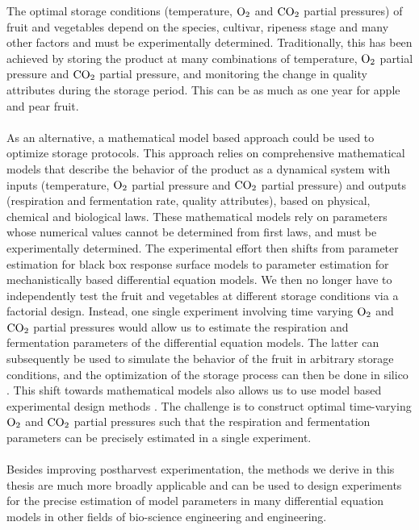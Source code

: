 The optimal storage conditions (temperature, $\text{O}_2$ and $\text{CO}_2$ partial pressures) of fruit and vegetables depend on the species, cultivar, ripeness stage and many other factors and must be experimentally determined. Traditionally, this has been achieved by storing the product at many combinations of temperature, $\text{O}_2$ partial pressure and $\text{CO}_2$ partial pressure, and monitoring the change in quality attributes during the storage period. This can be as much as one year for apple and pear fruit.
\\
\\
As an alternative, a mathematical model based approach could be used to optimize storage protocols. This approach relies on comprehensive mathematical models that describe the behavior of the product as a dynamical system with inputs (temperature, $\text{O}_2$ partial pressure and $\text{CO}_2$  partial pressure) and outputs (respiration and fermentation rate, quality attributes), based on physical, chemical and biological laws. {\color{red}These mathematical models rely on parameters whose numerical values cannot be determined from first laws, and must be experimentally determined. The experimental effort then shifts from parameter estimation for black box response surface models to parameter estimation for mechanistically based differential equation models. We then no longer have to independently test the fruit and vegetables at different storage conditions via a factorial design. Instead, one single experiment involving time varying $\text{O}_2$ and $\text{CO}_2$ partial pressures would allow us to estimate the respiration and fermentation parameters of the differential equation models. The latter can subsequently be used to simulate the behavior of the fruit in arbitrary storage conditions, and the optimization of the storage process can then be done in silico \parencite{tri}. This shift towards mathematical models also allows us to use model based experimental design methods \parencite{franceschini}. The challenge is to construct optimal time-varying $\text{O}_2$ and $\text{CO}_2$ partial pressures such that the respiration and fermentation parameters can be precisely estimated in a single experiment.}
\\
\\
{\color{red}Besides improving postharvest experimentation, the methods we derive in this thesis are much more broadly applicable and can be used to design experiments for the precise estimation of model parameters in many differential equation models in other fields of bio-science engineering and engineering.}
